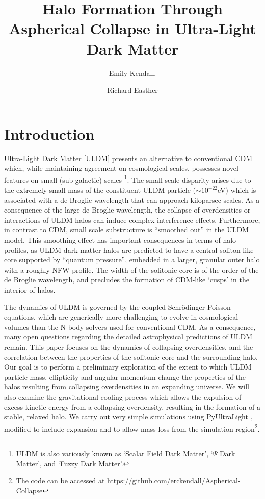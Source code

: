 \documentclass[a4paper,11pt]{article}
\title{\boldmath Halo Formation Through Aspherical Collapse in Ultra-Light Dark Matter}
\author[a]{Emily Kendall,}
\author[a]{Richard Easther}
\affiliation[a]{The University of Auckland, Private Bag 92019\\
Auckland 1142, New Zealand}
\begin{document}
\maketitle
\flushbottom

\section{Introduction}
\label{sec:intro}

Ultra-Light Dark Matter [ULDM] presents an alternative to conventional CDM which, while maintaining agreement on cosmological scales, possesses novel features on small (sub-galactic) scales \cite{Hui:2016ltb}\footnote{ULDM is also variously known as `Scalar Field Dark Matter', `$\Psi$ Dark Matter', and `Fuzzy Dark Matter'.}. The small-scale disparity arises due to the extremely small mass of the constituent ULDM particle ($\sim10^{-22}$eV) which is associated with a de Broglie wavelength that can approach kiloparsec scales. As a consequence of the large de Broglie wavelength, the collapse of overdensities or interactions of ULDM halos can induce complex interference effects. Furthermore, in contrast to CDM, small scale substructure is ``smoothed out'' in the ULDM model. This smoothing effect has important consequences in terms of halo profiles, as ULDM dark matter halos are predicted to have a central 
soliton-like core supported by ``quantum pressure'', embedded in a larger, granular outer halo with a roughly NFW profile. The width of the solitonic core is of the order of the de Broglie wavelength, and precludes the formation of CDM-like `cusps' in the interior of halos.

The dynamics of ULDM is governed by the coupled Schr\"{o}dinger-Poisson equations, which are generically more challenging to evolve in cosmological volumes than the N-body solvers used for conventional CDM. As a consequence, many open questions regarding the detailed astrophysical predictions of ULDM remain. This paper focuses on the dynamics of collapsing overdensities, and the correlation between the properties of the solitonic core and the surrounding halo. Our goal is to perform a preliminary exploration of the extent to which ULDM particle mass, ellipticity and angular momentum change the properties of the halos resulting from collapsing overdensities in an expanding universe. We will also examine the gravitational cooling process which allows the expulsion of excess kinetic energy from a collapsing overdensity, resulting in the formation of a stable, relaxed halo.
We carry out very simple simulations using {\sc PyUltraLight} \cite{Edwards:2018ccc}, modified to include expansion and to allow mass loss from the simulation region\footnote{The code can be accessed at https://github.com/erckendall/Aspherical-Collapse}. 
\end{document}
